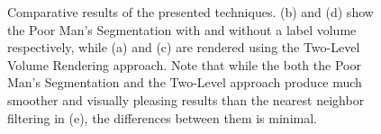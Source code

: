 \documentclass{egpubl}
\begin{document}
\begin{figure}
{		\label{fig:result:nn}
	}
	\caption{Comparative results of the presented techniques. (b) and (d) show the Poor Man's Segmentation with and without a label volume respectively, while (a) and (c) are rendered using the Two-Level Volume Rendering approach. Note that while the both the Poor Man's Segmentation and the Two-Level approach produce much smoother and visually pleasing results than the nearest neighbor filtering in (e), the differences between them is minimal.}
	\label{fig:result}
\end{figure}

\begin{figure}
	\centering
\end{figure}
\end{document}
